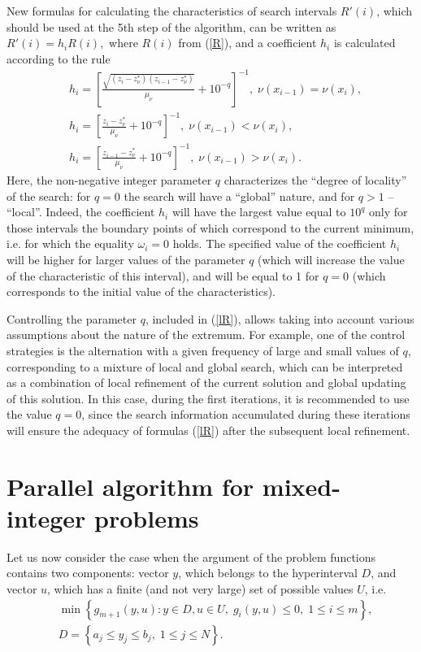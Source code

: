 \documentclass[
11pt,%
tightenlines,%
twoside,%
onecolumn,%
nofloats,%
nobibnotes,%
nofootinbib,%
superscriptaddress,%
noshowpacs,%
centertags]%
{revtex4}
\begin{document}
New formulas for calculating the characteristics of search intervals $R'(i)$, which should be used at the 5th step of the algorithm, can be written as
$
R'(i) = h_i R(i),
$
where $R(i)$ from (\ref{R}), and a coefficient $h_i$ is calculated  according to the rule
\begin{eqnarray}\label{lR}
& h_i = \left[\frac{\sqrt{(z_i-z_\nu^*)(z_{i-1}-z_\nu^*)}}{\mu_\nu}+10^{-q}\right]^{-1}, \; \nu(x_{i-1})=\nu(x_{i}),\nonumber\\
& h_i = \left[\frac{z_i-z_\nu^*}{\mu_\nu}+10^{-q}\right]^{-1}, \; \nu(x_{i-1})<\nu(x_{i}),\\
& h_i = \left[\frac{z_{i-1}-z_\nu^*}{\mu_\nu}+10^{-q}\right]^{-1}, \; \nu(x_{i-1})>\nu(x_{i}).\nonumber
\end{eqnarray}
Here, the non-negative integer parameter $q$ characterizes the ``degree of locality'' of the search: for $q=0$ the search will have a ``global'' nature, and for $q>1$ -- ``local''.
Indeed, the coefficient $h_i$ will have the largest value equal to $10^q$ only for those intervals the boundary points of which correspond to the current minimum, i.e. for which the equality $\omega_i = 0$ holds. The specified value of the coefficient $h_i$ will be higher for larger values of the parameter $q$ (which will increase the value of the characteristic of this interval), and will be equal to 1 for $q=0$ (which corresponds to the initial value of the characteristics).

Controlling the parameter $q$, included in (\ref{lR}), allows taking into account various assumptions about the nature of the extremum. For example, one of the control strategies is the alternation with a given frequency of large and small values of $q$, corresponding to a mixture of local and global search, which can be interpreted as a combination of local refinement of the current solution and global updating of this solution. In this case, during the first iterations, it is recommended to use the value $q=0$, since the search information accumulated during these iterations will ensure the adequacy of formulas (\ref{lR}) after the subsequent local refinement.


\section{Parallel algorithm for mixed-integer problems}

Let us now consider the case when the argument of the problem functions contains two components: vector $y$, which belongs to the hyperinterval $D$, and vector $u$, which has a finite (and not very large) set of possible values $U$, i.e.
\begin{eqnarray}\label{problem_i}
& \min{\left\{ g_{m+1}(y,u):y\in D, u \in U, \; g_i(y,u)\leq 0, \; 1 \leq i \leq m\right\}},\\
& D=\left\{a_j\leq y_j \leq b_j, \; 1\leq j \leq N \right\}.\nonumber
\end{eqnarray}
\end{document}
